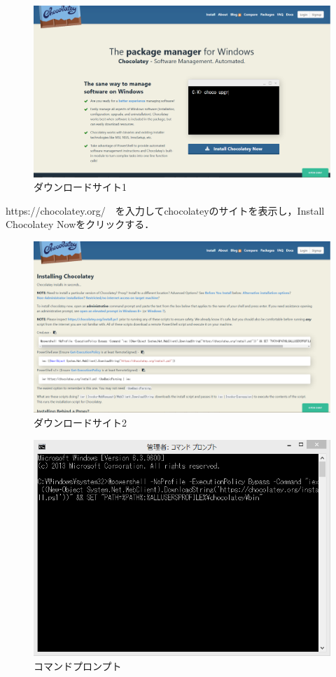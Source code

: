 \newpage


\begin{figure}[h]
\centering
\includegraphics[width=12cm]{choco2.PNG}
\caption{ダウンロードサイト1}\label{サンプル図}
\end{figure}

https://chocolatey.org/　を入力してchocolateyのサイトを表示し，Install Chocolatey Nowをクリックする．

\newpage

\begin{figure}[h]
\centering
\includegraphics[width=12cm]{choco3.PNG}
\caption{ダウンロードサイト2}\label{サンプル図}
\end{figure}





\newpage

\begin{figure}[h]
\centering
\includegraphics[width=12cm]{choco4.PNG}
\caption{コマンドプロンプト}\label{サンプル図}
\end{figure}

